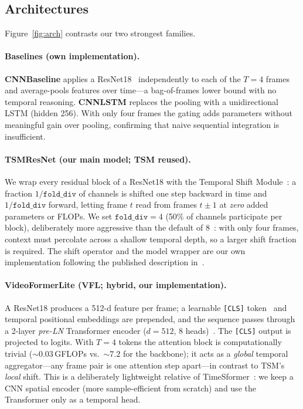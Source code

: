 \documentclass[10pt,twocolumn,letterpaper]{article}
\begin{document}
\subsection{Architectures}
\label{sec:arch}
Figure~\ref{fig:arch} contrasts our two strongest families.

\paragraph{Baselines (own implementation).}
\textbf{CNNBaseline} applies a ResNet18~\cite{he2016resnet} independently to each
of the $T{=}4$ frames and average-pools features over time---a bag-of-frames
lower bound with no temporal reasoning. \textbf{CNNLSTM} replaces the pooling
with a unidirectional LSTM (hidden 256). With only four frames the gating adds
parameters without meaningful gain over pooling, confirming that naive
sequential integration is insufficient.

\paragraph{TSMResNet (our main model; TSM reused).}
We wrap every residual block of a ResNet18 with the Temporal Shift
Module~\cite{lin2019tsm}: a fraction $1/\texttt{fold\_div}$ of channels is
shifted one step backward in time and $1/\texttt{fold\_div}$ forward, letting
frame $t$ read from frames $t{\pm}1$ at \emph{zero} added parameters or FLOPs.
We set $\texttt{fold\_div}{=}4$ (50\% of channels participate per block),
deliberately more aggressive than the default of
8~\cite{lin2019tsm}: with only four frames, context must percolate across a
shallow temporal depth, so a larger shift fraction is required. The shift
operator and the model wrapper are our own implementation following the
published description in~\cite{lin2019tsm}.

\paragraph{VideoFormerLite (VFL; hybrid, our implementation).}
A ResNet18 produces a 512-d feature per frame; a learnable \texttt{[CLS]}
token~\cite{dosovitskiy2021vit} and temporal positional embeddings are
prepended, and the sequence passes through a 2-layer \emph{pre-LN} Transformer
encoder ($d{=}512$, 8 heads)~\cite{xiong2020prenorm}. The \texttt{[CLS]} output
is projected to logits. With $T{=}4$ tokens the attention block is
computationally trivial (${\sim}0.03$\,GFLOPs vs.\ ${\sim}7.2$ for the backbone);
it acts as a \emph{global} temporal aggregator---any frame pair is one attention
step apart---in contrast to TSM's \emph{local} shift. This is a deliberately
lightweight relative of TimeSformer~\cite{bertasius2021timesformer}: we keep a
CNN spatial encoder (more sample-efficient from scratch) and use the Transformer
only as a temporal head.
\end{document}
